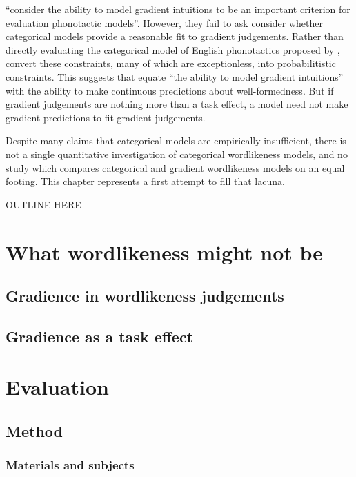 \citet[382]{Hayes2008a} ``consider the ability to model gradient intuitions to be an important criterion for evaluation phonotactic models''. However, they fail to ask consider whether categorical models provide a reasonable fit to gradient judgements. Rather than directly evaluating the categorical model of English phonotactics proposed by \citet{Clements1983}, \citeauthor{Hayes2008a} convert these constraints, many of which are exceptionless, into probabilitistic constraints. This suggests that \citeauthor{Hayes2008a} equate ``the ability to model gradient intuitions'' with the ability to make continuous predictions about well-formedness. But if gradient judgements are nothing more than a task effect, a model need not make gradient predictions to fit gradient judgements.

Despite many claims that categorical models are empirically insufficient, there is not a single quantitative investigation of categorical wordlikeness models, and no study which compares categorical and gradient wordlikeness models on an equal footing. This chapter represents a first attempt to fill that lacuna. 

OUTLINE HERE

\section{What wordlikeness might not be}

\subsection{Gradience in wordlikeness judgements}

\subsection{Gradience as a task effect}

\section{Evaluation} 
\label{2evaluation}

\subsection{Method}

\subsubsection{Materials and subjects}

